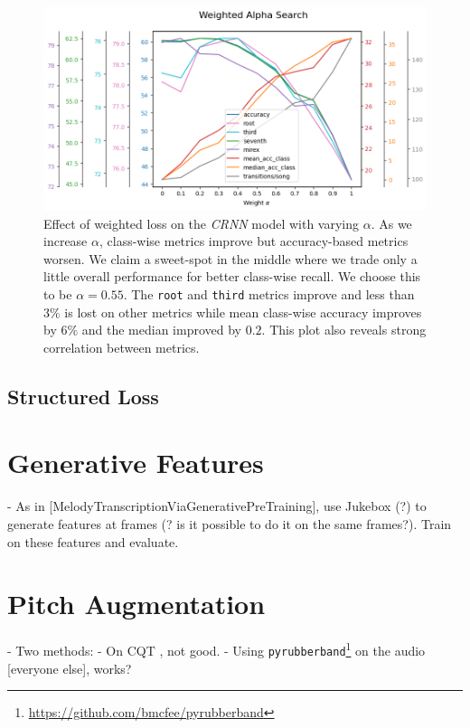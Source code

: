 \begin{figure}[H]
    \centering
    \includegraphics[width=1.0\textwidth]{figures/weight_alpha_search.png}
    \caption{Effect of weighted loss on the \emph{CRNN} model with varying $\alpha$. As we increase $\alpha$, class-wise metrics improve but accuracy-based metrics worsen. We claim a sweet-spot in the middle where we trade only a little overall performance for better class-wise recall. We choose this to be $\alpha = 0.55$. The \texttt{root} and \texttt{third} metrics improve and less than $3\%$ is lost on other metrics while mean class-wise accuracy improves by $6\%$ and the median improved by $0.2$. This plot also reveals strong correlation between metrics. }\label{fig:weighted_loss}
\end{figure}

\subsection{Structured Loss}

\section{Generative Features}

- As in [MelodyTranscriptionViaGenerativePreTraining], use Jukebox (?) to generate features at frames (? is it possible to do it on the same frames?). Train on these features and evaluate.

\section{Pitch Augmentation}
- Two methods:
- On CQT \citet{ACRLargeVocab1}, not good.
- Using \texttt{pyrubberband}\footnote{\url{https://github.com/bmcfee/pyrubberband}} on the audio [everyone else], works?

